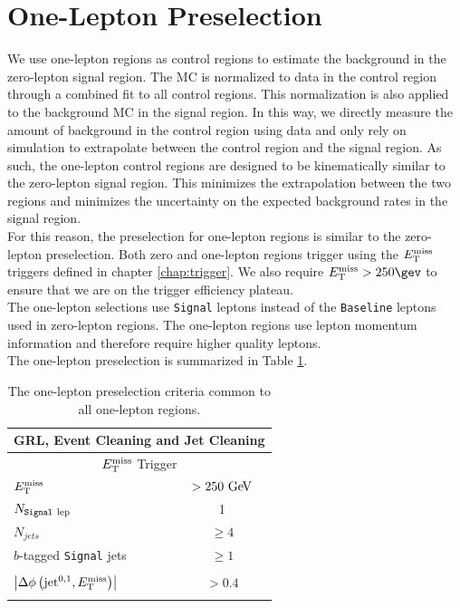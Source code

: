 \section{One-Lepton Preselection}

\indent We use one-lepton regions as control regions to estimate the background in the zero-lepton signal region.  The MC is normalized to data in the control region through a combined fit to all control regions. This normalization is also applied to the background MC in the signal region.  In this way, we directly measure the amount of background in the control region using data and only rely on simulation to extrapolate between the control region and the signal region.  As such, the one-lepton control regions are designed to be kinematically similar to the zero-lepton signal region.  This minimizes the extrapolation between the two regions and minimizes the uncertainty on the expected background rates in the signal region. \\

\indent For this reason, the preselection for one-lepton regions is similar to the zero-lepton preselection.  Both zero and one-lepton regions trigger using the $E_{\mathrm{T}}^{\mathrm{miss}}$ triggers defined in chapter \ref{chap:trigger}.  We also require $\met > 250 \gev$ to ensure that we are on the trigger efficiency plateau.  \\

\indent The one-lepton selections use {\tt Signal} leptons instead of the {\tt Baseline} leptons used in zero-lepton regions.  The one-lepton regions use lepton momentum information and therefore require higher quality leptons. \\

\indent The one-lepton preselection is summarized in Table \ref{tab:1Lcommon}. \\

\begin{table}[h!]
  \begin{center}
    \begin{tabular}{lc} \hline\hline
      \multicolumn{2}{c}{GRL, Event Cleaning and Jet Cleaning} \\ \hline
      \multicolumn{2}{c}{$E_{\mathrm{T}}^{\mathrm{miss}}$ Trigger} \\ \hline
      $E_{\mathrm{T}}^{\mathrm{miss}}$ & $> 250\GeV$ \\ 
      $N_{\rm{{\tt Signal}~lep}}$ & 1 \\
    $N_{jets}$ & $\ge 4$ \\ 
      $b$-tagged {\tt Signal} jets & $\ge1$ \\ 
                   & \\ [-2.5ex] 
      $\left|\Delta\phi\left(\mathrm{jet}^{0,1},E_{\mathrm{T}}^{\mathrm{miss}}\right)\right|$ & $> 0.4$ \\
             & \\ [-2.5ex] \hline
    \end{tabular}
  \caption{ The one-lepton preselection criteria common to all one-lepton regions.}
  \label{tab:1Lcommon}
  \end{center}
\end{table}

